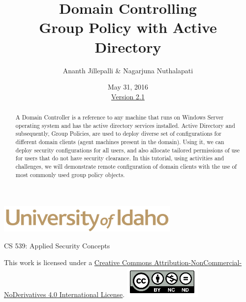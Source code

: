 \documentclass[12pt]{extarticle}
\begin{document}
\title{ Domain Controlling \\ \large Group Policy with Active Directory}
\author{Ananth Jillepalli \& Nagarjuna Nuthalapati}
\date{May 31, 2016 \\ \hyperref[changelog]{Version 2.1}} %
\renewcommand{\abstractname}{Summary}
\begin{titlepage}
\maketitle
{}
\begin{center}
\includegraphics[scale=.5]{UofI}

\large{CS 539: Applied Security Concepts}

\vskip 40pt

\end{center}
\begin{abstract}
A Domain Controller is a reference to any machine that runs on Windows Server operating system and has the active directory services installed. Active Directory and subsequently, Group Policies, are used to deploy diverse set of configurations for different domain clients (agent machines present in the domain). Using it, we can deploy security configurations for all users, and also allocate tailored permissions of use for users that do not have security clearance. In this tutorial, using activities and challenges, we will demonstrate remote configuration of domain clients with the use of most commonly used group policy objects.   
\end{abstract}


\vfill
\begin{center}
This work is licensed under a \href{https://creativecommons.org/licenses/by-nc-nd/2.0/}{Creative Commons Attribution-NonCommercial-NoDerivatives 4.0 International License}.
\vskip 10pt
\includegraphics[scale=.5]{cc}
\end{center}

\end{titlepage}

\end{document}
